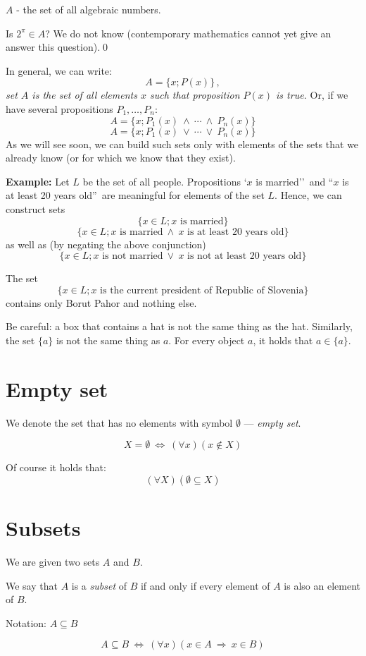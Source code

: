 \documentclass[11pt,paper=b5,footinclude,headinclude]{scrbook} %
\def\ali {{~\vee~}}
\def\inn {{~\wedge~}}
\def\sledi {{~\Rightarrow~}}
\def\cee {{~\Leftrightarrow~}}
\theoremstyle{remark}
\theoremstyle{definition} %
\theoremstyle{theorem} %
\begin{document}
\medskip
$A$ - the set of all algebraic numbers.

Is $2^{\pi}\in A$? We do not know (contemporary mathematics cannot yet give an answer this question).\qed

\medskip
In general, we can write:
$$A = \{x; P(x)\}\,,$$
{\em set $A$ is the set of all elements $x$ such that proposition $P(x)$ is true.}
Or, if we have several propositions $P_1,\ldots, P_n$:
$$A = \{x; P_1(x)\inn \cdots\inn P_n(x)\}$$
$$A = \{x; P_1(x)\ali \cdots\ali P_n(x)\}$$
As we will see soon, we can build such sets only with elements of the sets that we already know (or for which we know that they exist).

\medskip
\textbf{ Example:}
Let  $L$ be the set of all people. Propositions `$x$ is married''~and ``$x$ is at least 20 years old''~are meaningful for elements of the set $L$.
Hence, we can construct sets
      $$\{x\in L; x \textrm{ is married}\}$$
      $$\{x\in L; x \textrm{ is married} \inn x \textrm{ is at least 20 years old}\}$$
as well as (by negating the above conjunction)
      $$\{x\in L; x \textrm{ is not married} \ali x \textrm{ is not at least 20 years old}\}$$

The set
      $$\{x\in L; x \textrm{ is the current president of Republic of Slovenia}\}$$
contains only Borut Pahor and nothing else.

\medskip
Be careful: a box that contains a hat is not the same thing as the hat.
Similarly, the set
$\{a\}$ is not the same thing as $a$. For every object $a$, it holds that $a\in \{a\}$.

\section{Empty set}
We denote the set that has no elements with symbol $\emptyset$ --- {\em empty set}.

$$X = \emptyset \cee (\forall x)(x\not\in X)$$

Of course it holds that:
$$(\forall X) (\emptyset \subseteq X)$$

\section{Subsets}
We are given two sets $A$ and $B$.

We say that $A$ is a {\em subset} of $B$ if and only if every element of $A$ is also an element of  $B$.

Notation: $A\subseteq B$

$$A\subseteq B\cee (\forall x)(x\in A\sledi x\in B)$$
\end{document}
